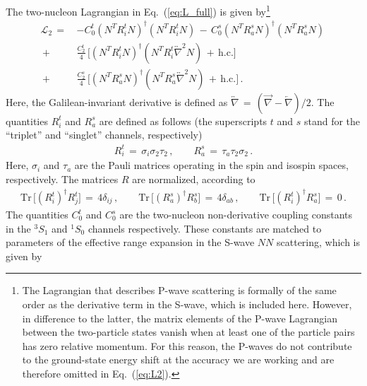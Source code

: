 \documentclass[12pt,prd,tightenlines,nofootinbib]{revtex4-2}
\begin{document}
The two-nucleon Lagrangian in Eq.~(\ref{eq:L_full}) is given by\footnote{The Lagrangian that describes P-wave scattering is formally of the same order as the derivative term in the S-wave, which is included here. However, in difference to the latter, the matrix elements of the P-wave Lagrangian
between the two-particle states vanish when at least one of the particle pairs has zero relative momentum. For this reason, the P-waves do not contribute to the ground-state energy shift at the accuracy we are working and are therefore omitted in Eq.~(\ref{eq:L2}).}
\begin{align}\label{eq:L2}
    \mathscr{L}_{2} \, = \, &- C_{0}^{t} (N^{T}R^{t}_{i}N)^{\dagger}(N^{T}R^{t}_{i}N)\,- \, C_{0}^{s}(N^{T}R^{s}_{a}N)^{\dagger}(N^{T}R^{s}_{a}N)\,\nonumber\\[2mm]
     \,+\,& \frac{C^{t}_{2}}{4}\,\Big[ (N^{T}R^{t}_{i}N)^{\dagger} ( N^{T} R^{t}_{i}\overleftrightarrow{\nabla}^{2}N) \,+\, \text{h.c.}\Big]\nonumber\\[2mm]
    \,+\,& \frac{C^{s}_{2}}{4}\,\Big[ (N^{T}R^{s}_{a}N)^{\dagger} ( N^{T}R^{s}_{a}\overleftrightarrow{\nabla}^{2}N)\,+\, \text{h.c.}\Big]\,.
\end{align}
Here, the Galilean-invariant derivative is defined as $\overleftrightarrow{\nabla}\,=\, (\overrightarrow{\nabla} - \overleftarrow{\nabla})/2$. The quantities $R^{t}_{i}$ and $R^{s}_{a}$ are defined as follows (the superscripts $t$ and $s$ stand for the ``triplet'' and ``singlet'' channels, respectively) 
\begin{align}
    R^{t}_{i} \, = \, \sigma_{i}\sigma_{2}\tau_{2}\,,\quad\quad
                   R^{s}_{a}\, = \, \tau_{a}\tau_{2}\sigma_{2}\,.
\end{align}
Here, $\sigma_i$ and $\tau_a$ are the Pauli matrices operating in the spin and
isospin spaces, respectively.
The matrices $R$ are normalized, according to
\begin{align}
\text{Tr}\,\bigl[(R^{t}_{i})^{\dagger}R^{t}_{j}\bigr]\, =\, 4\delta_{ij}\,,\quad\quad
\text{Tr}\,\bigl[(R^{s}_{a})^{\dagger}R^{s}_{b}\bigr]\, =\, 4\delta_{ab}\,,\quad\quad
\text{Tr}\,\bigl[(R^{t}_{i})^{\dagger}R^{s}_{a}\bigr]\, =\, 0\, .
\end{align}
The quantities $C^{t}_{0}$ and $C^{s}_{0}$ are the two-nucleon non-derivative
coupling constants in the $^{3}S_{1}$ and $^{1}S_{0}$ channels respectively. These
constants are matched to parameters of the effective range expansion in the
S-wave $NN$ scattering, which is given by
\end{document}
